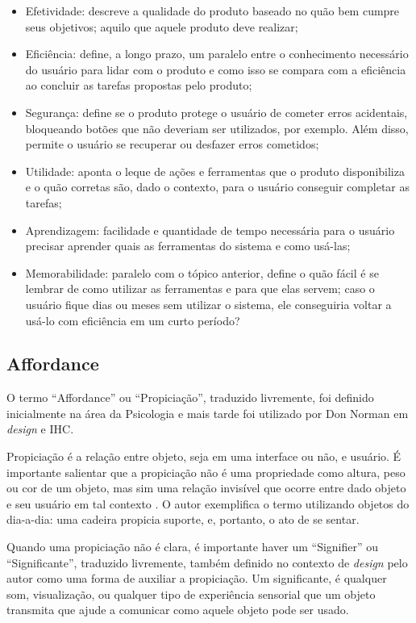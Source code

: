 \begin{itemize}
    \item Efetividade: descreve a qualidade do produto baseado no quão bem cumpre seus objetivos; aquilo que aquele produto deve realizar;
    \item Eficiência: define, a longo prazo, um paralelo entre o conhecimento necessário do usuário para lidar com o produto e como isso se compara com a eficiência ao concluir as tarefas propostas pelo produto;
    \item Segurança: define se o produto protege o usuário de cometer erros acidentais, bloqueando botões que não deveriam ser utilizados, por exemplo. Além disso, permite o usuário se recuperar ou desfazer erros cometidos;
    \item Utilidade: aponta o leque de ações e ferramentas que o produto disponibiliza e o quão corretas são, dado o contexto, para o usuário conseguir completar as tarefas;
    \item Aprendizagem: facilidade e quantidade de tempo necessária para o usuário precisar aprender quais as ferramentas do sistema e como usá-las; 
    \item Memorabilidade: paralelo com o tópico anterior, define o quão fácil é se lembrar de como utilizar as ferramentas e para que elas servem; caso o usuário fique dias ou meses sem utilizar o sistema, ele conseguiria voltar a usá-lo com eficiência em um curto período?
\end{itemize}

\subsection{Affordance}

O termo ``Affordance'' ou ``Propiciação'', traduzido livremente, foi definido inicialmente na área da Psicologia e mais tarde foi utilizado por Don Norman em \textit{design} e IHC.

Propiciação é a relação entre objeto, seja em uma interface ou não, e usuário. É importante salientar que a propiciação não é uma propriedade como altura, peso ou cor de um objeto, mas sim uma relação invisível que ocorre entre dado objeto e seu usuário em tal contexto \cite{Norman2013}.
O autor exemplifica o termo utilizando objetos do dia-a-dia: uma cadeira propicia suporte, e, portanto, o ato de se sentar.

Quando uma propiciação não é clara, é importante haver um ``Signifier'' ou ``Significante'', traduzido livremente, também definido no contexto de \textit{design} pelo autor como uma forma de auxiliar a propiciação.
Um significante, é qualquer som, visualização, ou qualquer tipo de experiência sensorial que um objeto transmita que ajude a comunicar como aquele objeto pode ser usado.

